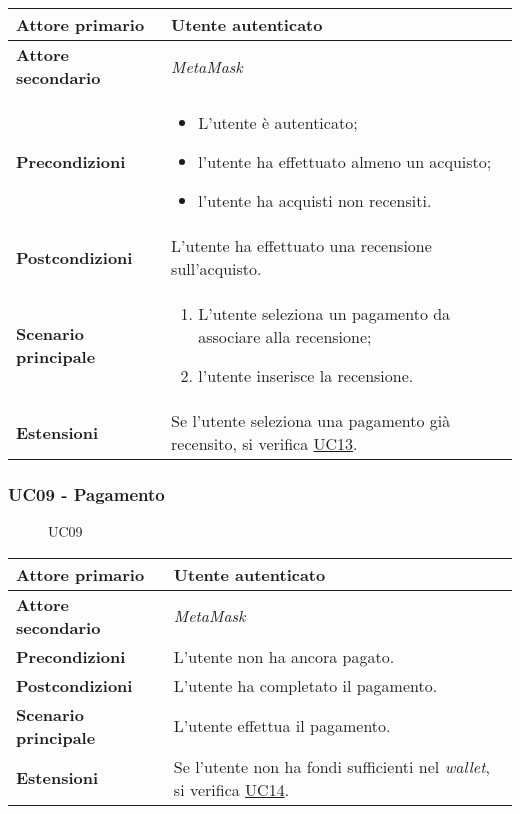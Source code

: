 \begin{center}
\renewcommand{\arraystretch}{1.5}
\begin{tabular}{ | m{10em} | m{20em} | }
    \hline
    \textbf{Attore primario} & Utente autenticato \\
    \hline
    \textbf{Attore secondario} & \textit{MetaMask} \\
    \hline
    \textbf{Precondizioni} & \begin{itemize}
        \item L'utente è autenticato;
        \item l'utente ha effettuato almeno un acquisto;
        \item l'utente ha acquisti non recensiti.
    \end{itemize} \\
    \hline
    \textbf{Postcondizioni} & L'utente ha effettuato una recensione sull'acquisto. \\
    \hline
    \textbf{Scenario principale} & \begin{enumerate}
        \item L'utente seleziona un pagamento da associare alla recensione;
        \item l'utente inserisce la recensione.
    \end{enumerate} \\
    \hline
    \textbf{Estensioni} & Se l'utente seleziona una pagamento già recensito, si verifica \hyperref[UC13]{UC13}. \\
    \hline
   \end{tabular}
\end{center}

\subsubsection{UC09 - Pagamento}
\label{UC09}

\begin{figure}[H]
    \centering
    
    \caption{UC09}
 \end{figure}

\begin{center}
\renewcommand{\arraystretch}{1.5}
\begin{tabular}{ | m{10em} | m{20em} | }
    \hline
    \textbf{Attore primario} & Utente autenticato \\
    \hline
    \textbf{Attore secondario} & \textit{MetaMask} \\
    \hline
    \textbf{Precondizioni} & L'utente non ha ancora pagato. \\
    \hline
    \textbf{Postcondizioni} & L'utente ha completato il pagamento. \\
    \hline
    \textbf{Scenario principale} & L'utente effettua il pagamento. \\
    \hline
    \textbf{Estensioni} & Se l'utente non ha fondi sufficienti nel \textit{wallet}, si verifica \hyperref[UC14]{UC14}.\\
    \hline
   \end{tabular}
\end{center}

